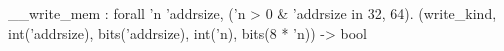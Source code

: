 __write_mem : forall 'n 'addrsize, ('n > 0 & 'addrsize in {32, 64}).
  (write_kind, int('addrsize), bits('addrsize), int('n), bits(8 * 'n)) -> bool
